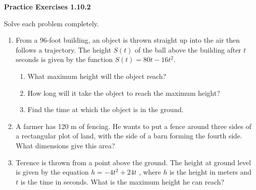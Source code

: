 \vspace{1ex}
\noindent\textbf{Practice Exercises 1.10.2}

\vspace{0.75ex}

Solve each problem completely. 
\begin{enumerate}[label = \color{blue}\arabic*. ]
\item From a 96-foot building, an object is thrown straight up into the air then follows a trajectory. The height $S(t)$ of the ball above the building after $t$ seconds is given by the function $S(t) = 80t - 16t^{2}$.
\begin{enumerate}[label = \color{blue}\alph*. ]
\item What maximum height will the object reach?
\item How long will it take the object to reach the maximum height?
\item Find the time at which the object is in the ground.
\end{enumerate}

\item A farmer has 120 m of fencing. He wants to put a fence around three sides of a 
rectangular plot of land, with the side of a barn forming the fourth side. What 
dimensions give this area?
\item Terence is thrown from a point above the ground. The height at ground level is given by the equation $h = -4t^{2} + 24t$ , where $h$ is the height in meters and $t$ is the time in seconds. What is the maximum height he can reach?
\end{enumerate}
